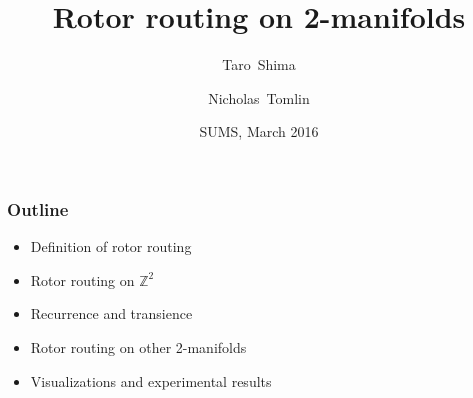 \documentclass{beamer}
\title{Rotor routing on 2-manifolds}
\author{Taro~Shima \and Nicholas~Tomlin}
\institute{Brown University}
\date{SUMS, March 2016}
\begin{document}

\frame{\titlepage}


	


\begin{frame}
	\frametitle{Outline}
	\pause
	\begin{itemize}
		\item Definition of rotor routing\pause
		\item Rotor routing on $\mathbb{Z}^2$\pause
		\item Recurrence and transience\pause
		\item Rotor routing on other 2-manifolds\pause
		\item Visualizations and experimental results
	\end{itemize}
	
\end{frame}


	

\end{document}
